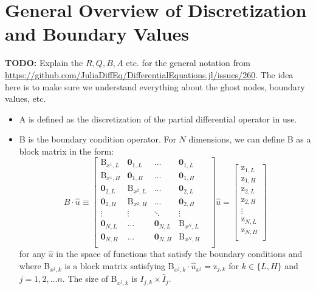 \documentclass[11pt]{article}
\begin{document}
	\section{General Overview of Discretization and Boundary Values}\label{sec:general}
	\textbf{TODO:} Explain the $R, Q, B, A$ etc. for the general notation from \url{https://github.com/JuliaDiffEq/DifferentialEquations.jl/issues/260}.  The idea here is to make sure we understand everything about the ghost nodes, boundary values, etc.
	\begin{itemize}
		\item A is defined as the discretization of the partial differential operator in use.
		
		\item B is the boundary condition operator. For $N$ dimensions, we can define B as a block matrix in the form:
		\begin{equation}
		B\cdot \hat{u} \equiv 
		\begin{bmatrix}
		\text{B}_{x^{1},L} & \mathbf{0}_{1,L}       & ...    & \mathbf{0}_{1,L}\\
		\text{B}_{x^{1},H} & \mathbf{0}_{1,H}       & ...    & \mathbf{0}_{1,H}\\
		\mathbf{0}_{2,L}   & \text{B}_{x^{2},L} &   ...    & \mathbf{0}_{2,L}\\
		\mathbf{0}_{2,H}   & \text{B}_{x^{2},H} &   ...    & \mathbf{0}_{2,H}\\
		\vdots  & \vdots  & \ddots & \vdots \\
		\mathbf{0}_{N,L}       & ...    & \mathbf{0}_{N,L} & \text{B}_{x^{N},L} & \\
		\mathbf{0}_{N,H}       & ...    & \mathbf{0}_{N,H} & \text{B}_{x^{N},H} & \\
		\end{bmatrix}
		\hat{u}
		=
		\begin{bmatrix}
		\text{z}_{{1},L}\\
		\text{z}_{{1},H}\\
		\text{z}_{{2},L}\\
		\text{z}_{{2},H}\\
		\vdots\\
		\text{z}_{{N},L}\\
		\text{z}_{{N},H}\\
		\end{bmatrix}
		\label{B_operator_block}
		\end{equation}
		for any $\hat{u}$ in the space of functions that satisfy the boundary conditions and where B$_{x^j,k}$ is a block matrix satisfying B$_{x^j,k}\cdot \hat{u}_{x^j} = \text{z}_{j,k}$ for $k \in \{L,H\}$ and $j = 1, 2,\dots n$. The size of B$_{x^j,k}$ is $I_{j,k} \times \hat{I}_j$.
		

\end{itemize}
\end{document}
